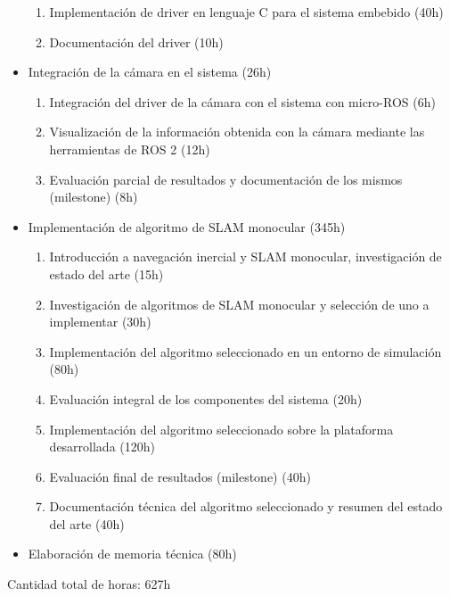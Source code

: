 \documentclass[
11pt, %
codirector, %
]{charter}
\begin{document}
\begin{itemize}
\begin{enumerate}
		\item Implementación de driver en lenguaje C para el sistema embebido (40h)
		\item Documentación del driver (10h)
	\end{enumerate}
	\item Integración de la cámara en el sistema (26h)
	\begin{enumerate}
		\item Integración del driver de la cámara con el sistema con micro-ROS (6h)
		\item Visualización de la información obtenida con la cámara mediante las herramientas de ROS 2 (12h)
		\item Evaluación parcial de resultados y documentación de los mismos (milestone) (8h)
	\end{enumerate}
	\item Implementación de algoritmo de SLAM monocular (345h)
	\begin{enumerate}
		\item Introducción a navegación inercial y SLAM monocular, investigación de estado del arte (15h)
		\item Investigación de algoritmos de SLAM monocular y selección de uno a implementar (30h)
		\item Implementación del algoritmo seleccionado en un entorno de simulación (80h)
		\item Evaluación integral de los componentes del sistema (20h)
		\item Implementación del algoritmo seleccionado sobre la plataforma desarrollada (120h)
		\item Evaluación final de resultados (milestone) (40h)
		\item Documentación técnica del algoritmo seleccionado y resumen del estado del arte (40h)
	\end{enumerate}
	\item Elaboración de memoria técnica (80h)
\end{itemize}

Cantidad total de horas: 627h
\end{document}
